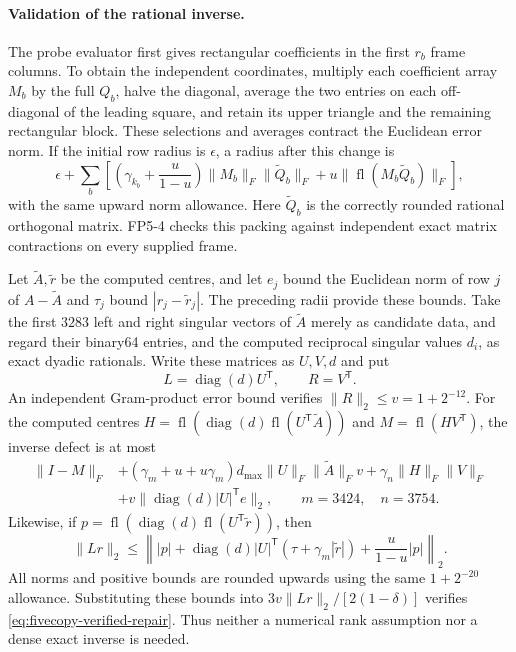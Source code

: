 \paragraph{Validation of the rational inverse.}
The probe evaluator first gives rectangular coefficients in the first
$r_b$ frame columns. To obtain the independent coordinates, multiply
each coefficient array $M_b$ by the full $Q_b$, halve the diagonal,
average the two entries on each off-diagonal of the leading square,
and retain its upper triangle and the remaining rectangular block.
These selections and averages contract the Euclidean error norm.
If the initial row radius is $\epsilon$, a radius after this change is
\[
 \epsilon+\sum_b\left[
 \left(\gamma_{k_b}+\frac{u}{1-u}\right)\|M_b\|_F\|\widetilde Q_b\|_F
 +u\|\operatorname{fl}(M_b\widetilde Q_b)\|_F\right],
\]
with the same upward norm allowance. Here $\widetilde Q_b$ is the
correctly rounded rational orthogonal matrix. FP5-4 checks this packing
against independent exact matrix contractions on every supplied frame.

Let $\widetilde A,\widetilde r$ be the computed centres, and let $e_j$
bound the Euclidean norm of row $j$ of $A-\widetilde A$ and $\tau_j$
bound $|r_j-\widetilde r_j|$. The preceding radii provide these bounds.
Take the first $3283$ left and right singular vectors of
$\widetilde A$ merely as candidate data, and regard their binary64
entries, and the computed reciprocal singular values $d_i$, as exact
dyadic rationals. Write these matrices as $U,V,d$ and put
\[
 L=\operatorname{diag}(d)U^{\mathsf T},\qquad R=V^{\mathsf T}.
\]
An independent Gram-product error bound verifies
$\|R\|_2\le v=1+2^{-12}$.
For the computed centres
$H=\operatorname{fl}(\operatorname{diag}(d)\operatorname{fl}(U^{\mathsf T}\widetilde A))$
and $M=\operatorname{fl}(HV^{\mathsf T})$, the inverse defect is at most
\begin{align*}
 \|I-M\|_F
 &+(\gamma_m+u+u\gamma_m)d_{\max}\|U\|_F\|\widetilde A\|_Fv
   +\gamma_n\|H\|_F\|V\|_F\\
 &+v\|\operatorname{diag}(d)|U|^{\mathsf T}e\|_2,
 \qquad m=3424,\quad n=3754.
\end{align*}
Likewise, if $p=\operatorname{fl}(\operatorname{diag}(d)
\operatorname{fl}(U^{\mathsf T}\widetilde r))$, then
\[
 \|Lr\|_2\le
 \left\||p|+\operatorname{diag}(d)|U|^{\mathsf T}
       (\tau+\gamma_m|\widetilde r|)+\frac{u}{1-u}|p|\right\|_2.
\]
All norms and positive bounds are rounded upwards using the same
$1+2^{-20}$ allowance. Substituting these bounds into
$3v\|Lr\|_2/[2(1-\delta)]$ verifies
\eqref{eq:fivecopy-verified-repair}. Thus neither a numerical rank assumption nor a dense exact inverse is
needed.
